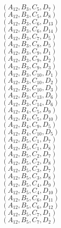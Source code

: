 \documentclass[14pt]{article}
\begin{document}
    $({A}_{12}, {B}_{3}, {C}_{5}, {D}_{7}) $ \\ 
    $({A}_{12}, {B}_{3}, {C}_{5}, {D}_{8}) $ \\ 
    $({A}_{12}, {B}_{3}, {C}_{6}, {D}_{13}) $ \\ 
    $({A}_{12}, {B}_{3}, {C}_{6}, {D}_{14}) $ \\ 
    $({A}_{12}, {B}_{3}, {C}_{7}, {D}_{5}) $ \\ 
    $({A}_{12}, {B}_{3}, {C}_{8}, {D}_{5}) $ \\ 
    $({A}_{12}, {B}_{3}, {C}_{9}, {D}_{1}) $ \\ 
    $({A}_{12}, {B}_{3}, {C}_{9}, {D}_{2}) $ \\ 
    $({A}_{12}, {B}_{3}, {C}_{9}, {D}_{3}) $ \\ 
    $({A}_{12}, {B}_{3}, {C}_{10}, {D}_{1}) $ \\ 
    $({A}_{12}, {B}_{3}, {C}_{10}, {D}_{2}) $ \\ 
    $({A}_{12}, {B}_{3}, {C}_{10}, {D}_{3}) $ \\ 
    $({A}_{12}, {B}_{3}, {C}_{13}, {D}_{6}) $ \\ 
    $({A}_{12}, {B}_{3}, {C}_{14}, {D}_{6}) $ \\ 
    $({A}_{12}, {B}_{4}, {C}_{5}, {D}_{9}) $ \\ 
    $({A}_{12}, {B}_{4}, {C}_{5}, {D}_{10}) $ \\ 
    $({A}_{12}, {B}_{4}, {C}_{9}, {D}_{5}) $ \\ 
    $({A}_{12}, {B}_{4}, {C}_{10}, {D}_{5}) $ \\ 
    $({A}_{12}, {B}_{5}, {C}_{1}, {D}_{7}) $ \\ 
    $({A}_{12}, {B}_{5}, {C}_{1}, {D}_{8}) $ \\ 
    $({A}_{12}, {B}_{5}, {C}_{2}, {D}_{7}) $ \\ 
    $({A}_{12}, {B}_{5}, {C}_{2}, {D}_{8}) $ \\ 
    $({A}_{12}, {B}_{5}, {C}_{3}, {D}_{7}) $ \\ 
    $({A}_{12}, {B}_{5}, {C}_{3}, {D}_{8}) $ \\ 
    $({A}_{12}, {B}_{5}, {C}_{4}, {D}_{9}) $ \\ 
    $({A}_{12}, {B}_{5}, {C}_{4}, {D}_{10}) $ \\ 
    $({A}_{12}, {B}_{5}, {C}_{6}, {D}_{11}) $ \\ 
    $({A}_{12}, {B}_{5}, {C}_{6}, {D}_{12}) $ \\ 
    $({A}_{12}, {B}_{5}, {C}_{7}, {D}_{1}) $ \\ 
    $({A}_{12}, {B}_{5}, {C}_{7}, {D}_{2}) $ \\ 
\end{document}
